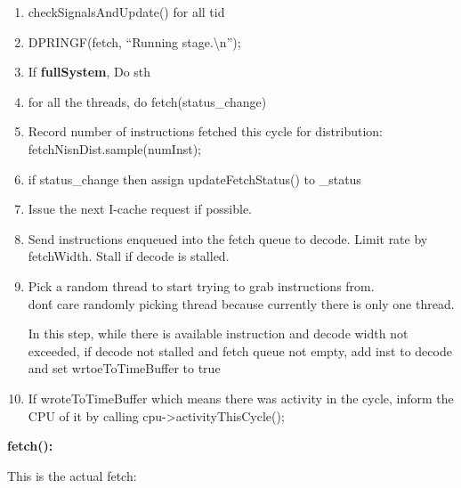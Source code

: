 \documentclass[11pt]{article}
\begin{document}
\begin{enumerate}
	\item checkSignalsAndUpdate() for all tid
	\item DPRINGF(fetch, ``Running stage.\textbackslash n'');
	\item If \textbf{fullSystem}, Do sth
	\item for all the threads, do fetch(status\_change)
	\item Record number of instructions fetched this cycle for distribution:\\
    fetchNisnDist.sample(numInst);
	\item if status\_change then assign updateFetchStatus() to \_status
	\item Issue the next I-cache request if possible.
	\item Send instructions enqueued into the fetch queue to decode. Limit rate by fetchWidth.  Stall if decode is stalled.
	\item Pick a random thread to start trying to grab instructions from.\\
	
	don\'t care randomly picking thread because currently there is only one thread.
	
	In this step, while there is available instruction and decode width not exceeded, if decode not stalled and fetch queue not empty, add inst to decode and set wrtoeToTimeBuffer to true
	
	\item If wroteToTimeBuffer which means there was activity in the cycle, inform the CPU of it by calling cpu->activityThisCycle();
\end{enumerate}

\textbf{fetch():\\}

This is the actual fetch:\\
\end{document}
